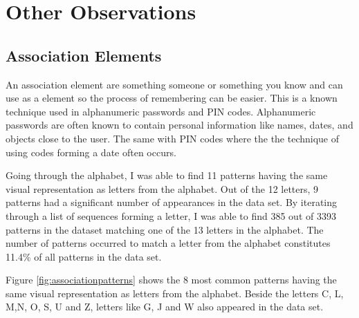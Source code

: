 
\section{Other Observations}


\subsection{Association Elements} \label{sec:associationelements}
	An association element are something someone or something you know and can use as a element so the process of remembering can be easier. This is a known technique used in alphanumeric passwords and PIN codes. Alphanumeric passwords are often known to contain personal information like names, dates, and objects close to the user. The same with PIN codes where the the technique of using codes forming a date often occurs. 

  Going through the alphabet, I was able to find 11 patterns having the same visual representation as letters from the alphabet. Out of the 12 letters, 9 patterns had a significant number of appearances in the data set. By iterating through a list of sequences forming a letter, I was able to find 385 out of 3393 patterns in the dataset matching one of the 13 letters in the alphabet. The number of patterns occurred to match a letter from the alphabet constitutes 11.4\% of all patterns in the data set. 

  Figure \ref{fig:associationpatterns} shows the 8 most common patterns having the same visual representation as letters from the alphabet. Beside the letters C, L, M,N, O, S, U and Z, letters like G, J and W also appeared in the data set.

  \clearpage

